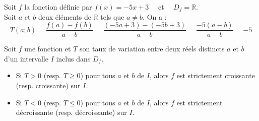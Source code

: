 \begin{Exemple}[][10 min]
Soit $f$ la fonction définie par $f(x) = -5x + 3 \quad$ et $\quad D_f = \mathbb{R}$. 
\vspace{0.1cm} \\
Soit $a$ et $b$ deux éléments de $\mathbb{R}$ tels que $a \neq b$. On a : 
\[ T(a;b) = \frac{f(a)-f(b)}{a-b} = \frac{(-5a+3) - (-5b+3)}{a-b} = \frac{-5(a-b)}{a-b} = -5 \]
\end{Exemple}

\begin{Propriete}[][]
Soit $f$ une fonction et $T$ son taux de variation entre deux réels distincts $a$ et $b$ d'un intervalle $I$ inclus dans $D_f$.
\begin{itemize}
    \item Si $T > 0$ (resp. $T \geq 0$) pour tous $a$ et $b$ de $I$, alors $f$ est strictement croissante (resp. croissante) sur $I$.
    \item Si $T < 0$ (resp. $T \leq 0$) pour tous $a$ et $b$ de $I$, alors $f$ est strictement décroissante (resp. décroissante) sur $I$.
\end{itemize}
\end{Propriete}

